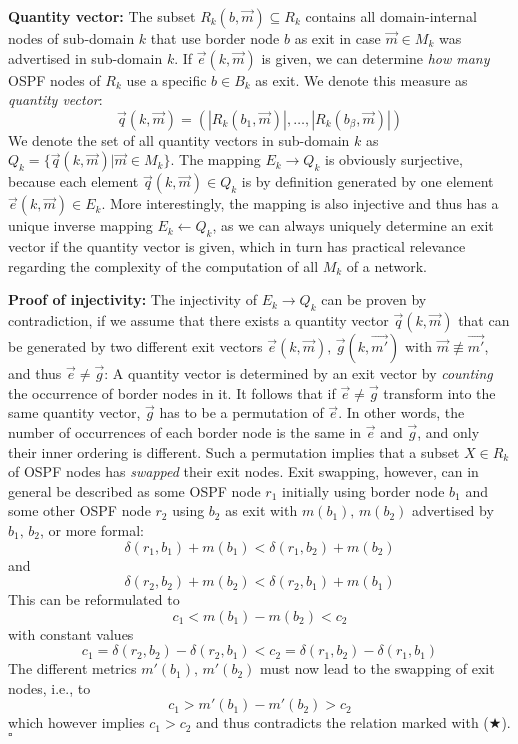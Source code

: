 \documentclass[journal]{IEEEtran}
\begin{document}
\vspace{1mm}\noindent \textbf{Quantity vector:} The subset $R_k(b,\vec{m}) \subseteq R_k$ contains all domain-internal nodes of sub-domain $k$ that use border node $b$ as exit in case $\vec{m}\in M_k$ was advertised in sub-domain $k$. If $\vec{e}(k,\vec{m})$ is given, we can determine \emph{how many} OSPF nodes of $R_k$ use a specific $b\in B_k$ as exit. We denote this measure as \emph{quantity vector}:
\[
\vec{q}(k,\vec{m}) = (|R_k(b_1,\vec{m})|,\ldots , |R_k(b_\beta,\vec{m})|)
\]
We denote the set of all quantity vectors in sub-domain $k$ as $Q_k=\{ \vec{q}(k,\vec{m}) | \vec{m}\in M_k \}$. The mapping $E_k \rightarrow Q_k$ is obviously surjective, because each element $\vec{q}(k,\vec{m})\in Q_k$ is by definition generated by one element $\vec{e}(k,\vec{m})\in E_k$. More interestingly, the mapping is also injective and thus has a unique inverse mapping $E_k \leftarrow Q_k$, as we can always uniquely determine an exit vector if the quantity vector is given, which in turn has practical relevance regarding the complexity of the computation of all $M_k$ of a network.

\vspace{1mm}\noindent \textbf{Proof of injectivity:} The injectivity of $E_k \rightarrow Q_k$ can be proven by contradiction, if we assume that there exists a quantity vector $\vec{q}(k,\vec{m})$ that can be generated by two different exit vectors $\vec{e}(k,\vec{m}),\, \vec{g}(k,\vec{m'})$ with $\vec{m}\not\equiv \vec{m'}$, and thus $\vec{e} \neq \vec{g}$: A quantity vector is determined by an exit vector by \emph{counting} the occurrence of border nodes in it. It follows that if $\vec{e} \neq \vec{g}$ transform into the same quantity vector, $\vec{g}$ has to be a permutation of $\vec{e}$. In other words, the number of occurrences of each border node is the same in $\vec{e}$ and $\vec{g}$, and only their inner ordering is different. Such a permutation implies that a subset $X\in R_k$ of OSPF nodes has \emph{swapped} their exit nodes. Exit swapping, however, can in general be described as some OSPF node $r_1$ initially using border node $b_1$ and some other OSPF node $r_2$ using $b_2$ as exit with $m(b_1),\, m(b_2)$ advertised by $b_1,\, b_2$, or more formal:
\[
\delta (r_1,b_1) + m(b_1) < \delta (r_1,b_2) + m(b_2)
\]
and 
\[
\delta (r_2,b_2) + m(b_2) < \delta (r_2,b_1) + m(b_1)
\]
This can be reformulated to
\[
c_1 < m(b_1)-m(b_2) < c_2 
\]
with constant values
\[
c_1=\delta (r_2,b_2)-\delta (r_2,b_1) < c_2=\delta (r_1,b_2)-\delta (r_1,b_1)\tag{$\bigstar$}
\]
The different metrics $m'(b_1),\, m'(b_2)$ must now lead to the swapping of exit nodes, i.e., to
\[
c_1 > m'(b_1)-m'(b_2) > c_2
\]
which however implies $c_1>c_2$ and thus contradicts the relation marked with ($\bigstar$).\hfill\ensuremath{\square}
\end{document}
